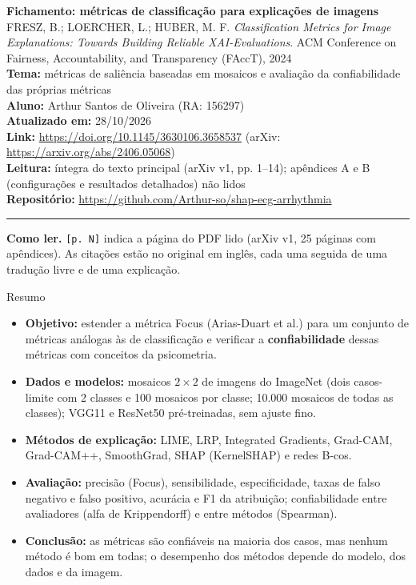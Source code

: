 \documentclass[11pt,a4paper]{article}
\begin{document}
\begin{center}
    {\LARGE \textbf{Fichamento: métricas de classificação para explicações de imagens}} \\[0.35em]
    {\large FRESZ, B.; LOERCHER, L.; HUBER, M. F. \textit{Classification Metrics for Image Explanations: Towards Building Reliable XAI-Evaluations}. ACM Conference on Fairness, Accountability, and Transparency (FAccT), 2024} \\[0.3em]
    \textbf{Tema:} métricas de saliência baseadas em mosaicos e avaliação da confiabilidade das próprias métricas \\[0.2em]
    \textbf{Aluno:} Arthur Santos de Oliveira (RA: 156297) \\[0.2em]
    \textbf{Atualizado em:} 28/10/2026 \\[0.2em]
    \textbf{Link:} \url{https://doi.org/10.1145/3630106.3658537} (arXiv: \url{https://arxiv.org/abs/2406.05068}) \\[0.2em]
    \textbf{Leitura:} íntegra do texto principal (arXiv v1, pp. 1--14); apêndices A e B (configurações e resultados detalhados) não lidos \\[0.2em]
    \textbf{Repositório:} \url{https://github.com/Arthur-so/shap-ecg-arrhythmia}
\end{center}
\vspace{-0.5em}
\hrule
\vspace{0.8em}

\textbf{Como ler.} \texttt{[p. N]} indica a página do PDF lido (arXiv v1, 25 páginas com apêndices). As citações estão no original em inglês, cada uma seguida de uma tradução livre e de uma explicação.

\begin{infobox}[note]{Resumo}
\begin{itemize}
  \item \textbf{Objetivo:} estender a métrica Focus (Arias-Duart et al.) para um conjunto de métricas análogas às de classificação e verificar a \textbf{confiabilidade} dessas métricas com conceitos da psicometria.
  \item \textbf{Dados e modelos:} mosaicos $2 \times 2$ de imagens do ImageNet (dois casos-limite com 2 classes e 100 mosaicos por classe; 10.000 mosaicos de todas as classes); VGG11 e ResNet50 pré-treinadas, sem ajuste fino.
  \item \textbf{Métodos de explicação:} LIME, LRP, Integrated Gradients, Grad-CAM, Grad-CAM++, SmoothGrad, SHAP (KernelSHAP) e redes B-cos.
  \item \textbf{Avaliação:} precisão (Focus), sensibilidade, especificidade, taxas de falso negativo e falso positivo, acurácia e F1 da atribuição; confiabilidade entre avaliadores (alfa de Krippendorff) e entre métodos (Spearman).
  \item \textbf{Conclusão:} as métricas são confiáveis na maioria dos casos, mas nenhum método é bom em todas; o desempenho dos métodos depende do modelo, dos dados e da imagem.
\end{itemize}
\end{infobox}
\end{document}
